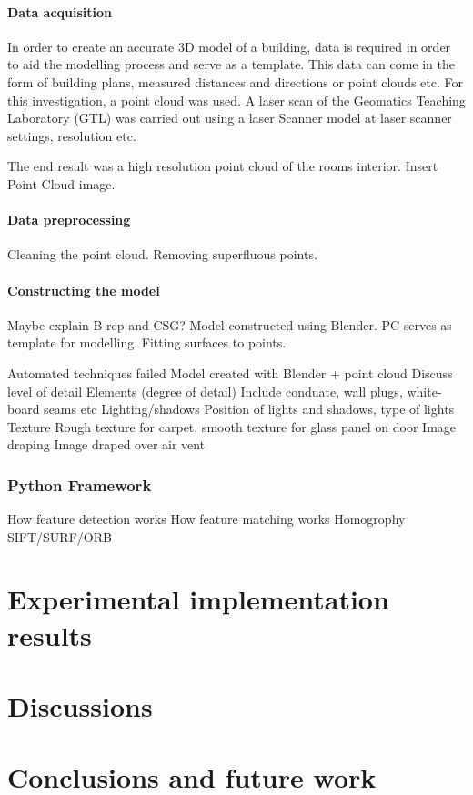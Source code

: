 \documentclass[11pt,a4paper]{report}
\begin{document}
			\subsubsection{Data acquisition}
				In order to create an accurate 3D model of a building, data is required in order to aid the modelling process and serve as a template. This data can come in the form of building plans, measured distances and directions or point clouds etc.
				For this investigation, a point cloud was used. A laser scan of the Geomatics Teaching Laboratory (GTL) was carried out using a {{laser Scanner model}} at {{laser scanner settings, resolution etc}}. 
				
				The end result was a high resolution point cloud of the rooms interior. {{Insert Point Cloud image}}.
				
			\subsubsection{Data preprocessing}
				Cleaning the point cloud.
				Removing superfluous points.
				
			\subsubsection{Constructing the model}
				Maybe explain B-rep and CSG?
				Model constructed using Blender.
				PC serves as template for modelling.
					Fitting surfaces to points.
				
			

			Automated techniques failed
			Model created with Blender + point cloud
			Discuss level of detail
				Elements (degree of detail)
					Include conduate, wall plugs, white-board seams etc
				Lighting/shadows
					Position of lights and shadows, type of lights
				Texture
					Rough texture for carpet, smooth texture for glass panel on door
				Image draping
					Image draped over air vent
		\subsection{Python Framework}
			How feature detection works
			How feature matching works
			Homogrophy
			SIFT/SURF/ORB
					

\chapter{Experimental implementation results}

\chapter{Discussions}

\chapter{Conclusions and future work}

\newpage
\printbibliography
\end{document}
